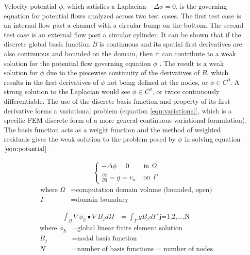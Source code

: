 \documentclass[conf]{new-aiaa}
\begin{document}
Velocity potential $\phi$, which satisfies a Laplacian $-\Delta\phi=0$, is the governing equation for potential flows \cite{luo} analyzed across two test cases.  The first test case is an internal flow past a channel with a circular bump on the bottom.  The second test case is an external flow past a circular cylinder.  It can be shown that if the discrete global basis function $B$ is continuous and its spatial first derivatives are also continuous and bounded on the domain, then it can contribute to a weak solution for the potential flow governing equation $\phi$ \cite{luo}.  The result is a weak solution for $\phi$ due to the piecewise continuity of the derivatives of $B$, which results in the first derivatives of $\phi$ not being defined at the nodes, or $\phi \in C^0$.  A strong solution to the Laplacian would see $\phi \in C^2$, or twice continuously differentiable.  The use of the discrete basis function and property of its first derivative forms a variational problem (equation \ref{eqn:variational}, which is a specific FEM discrete form of a more general continuous variational formulation).  The basis function acts as a weight function and the method of weighted residuals gives the weak solution to the problem posed by $\phi$ in solving equation $\ref{eqn:potential}$.

\begin{align}
	\begin{cases}
		-\Delta\phi = 0 & \text{\ in\ }\Omega \\
		\frac{\partial\phi}{\partial n} = g = v_n & \text{\ on \ } \Gamma
	\end{cases}\label{eqn:potential}
\end{align}
\begin{align*}
	\text{where\ \ \ \ }
	\Omega &= \text{computation domain volume (bounded, open)} \\
	\Gamma &= \text{domain boundary}
\end{align*}

\begin{align}
	\int_{\Omega} \nabla \phi_h \bullet \nabla B_j d\Omega &= \int_{\Gamma} gB_j d\Gamma \text{\ \ \ \ \ j=1,2,...,N} \label{eqn:variational}
\end{align}
\begin{align*}
	\text{where\ \ \ \ }
	\phi_h &= \text{global linear finite element solution} \\
	B_j &= \text{nodal basis function} \\
	N &= \text{number of basis functions = number of nodes}
\end{align*}
\end{document}
